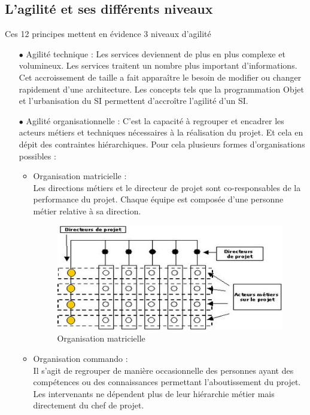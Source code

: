\documentclass[12pt,a4paper]{article}
\begin{document}
\subsection{L'agilité et ses différents niveaux}

Ces 12 principes mettent en évidence 3 niveaux d’agilité 
\begin{itemize}

\item[$\bullet$] Agilité technique : Les services deviennent de plus en plus complexe et volumineux. Les services traitent un nombre plus important d’informations. Cet accroissement de taille a fait apparaître le besoin de modifier ou changer rapidement d’une architecture. Les concepts tels que la programmation Objet et l’urbanisation du SI permettent d’accroître l’agilité d’un SI.\\

\item[$\bullet$] Agilité organisationnelle : C’est la capacité à regrouper et encadrer les acteurs métiers et techniques nécessaires à la réalisation du projet. Et cela en dépit des contraintes hiérarchiques. Pour cela plusieurs formes d’organisations possibles :\\

\begin{itemize}

\item Organisation matricielle :\\
Les directions métiers et le directeur de projet sont co-responsables de la performance du projet.
Chaque équipe est composée d’une personne métier relative à sa direction.

\begin{figure}[h!]
\centering
\includegraphics[scale=1]{"orga matricielle"}
\caption{Organisation matricielle}
\label{fig:matrice}
\end{figure}

\item Organisation commando : \\
Il s’agit de regrouper de manière occasionnelle des personnes ayant des compétences ou des connaissances permettant l’aboutissement du projet.
Les intervenants ne dépendent plus de leur hiérarchie métier mais directement du chef de projet.


\end{itemize}
\end{itemize}
\end{document}
